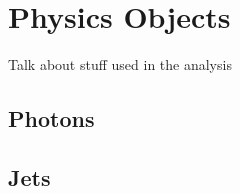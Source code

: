\chapter{Physics Objects\label{ch:objects}}

Talk about stuff used in the analysis

\section{Photons}

\section{Jets}
